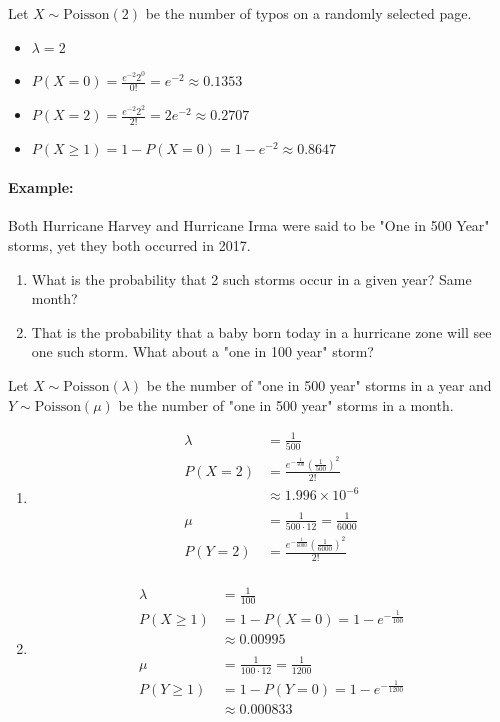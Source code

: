 \pagebreak

Let $X \sim \text{Poisson}(2)$ be the number of typos on a randomly selected page.
\begin{itemize}
    \item $\lambda = 2$
    \item $P(X=0) = \frac{e^{-2} 2  ^0}{0!} = e^{-2} \approx 0.1353$
    \item $P(X=2) = \frac{e^{-2} 2 ^2}{2!} = 2e^{-2} \approx 0.2707$
    \item $P(X \geq 1) = 1 - P(X=0) = 1 - e^{-2} \approx 0.8647$
\end{itemize}

\paragraph*{Example:}
Both Hurricane Harvey and Hurricane Irma were said to be "One in 500 Year" storms, yet they both 
occurred in 2017.
\begin{enumerate}
    \item What is the probability that 2 such storms occur in a given year? Same month?
    \item That is the probability that a baby born today in a hurricane zone will see one such storm.
    What about a "one in 100 year" storm?
\end{enumerate}

Let $X \sim \text{Poisson}(\lambda)$ be the number of "one in 500 year" storms in a year and 
$Y \sim \text{Poisson}(\mu)$ be the number of "one in 500 year" storms in a month.
\begin{enumerate}
    \item \begin{align*}
        \lambda &= \frac{1}{500} \\
        P(X=2) &= \frac{e^{-\frac{1}{500}} \left(\frac{1}{500}\right)^2}{2!} \\
        &\approx 1.996 \times 10^{-6}\\
        \\
        \mu &= \frac{1}{500 \cdot 12} = \frac{1}{6000} \\
        P(Y=2) &= \frac{e^{-\frac{1}{6000}} \left(\frac{1}{6000}\right)^2}{2!} \\
    \end{align*}
    \item \begin{align*}
        \lambda &= \frac{1}{100} \\
        P(X \geq 1) &= 1 - P(X=0) = 1 - e^{-\frac{1}{100}} \\
        &\approx 0.00995\\
        \\
        \mu &= \frac{1}{100 \cdot 12} = \frac{1}{1200} \\
        P(Y \geq 1) &= 1 - P(Y=0) = 1 - e^{-\frac{1}{1200}} \\
        &\approx 0.000833
    \end{align*}
\end{enumerate}